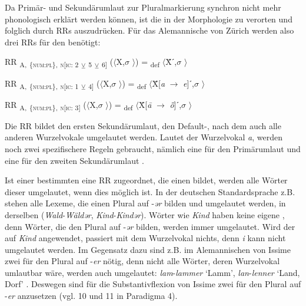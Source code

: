 Da Primär- und Sekundärumlaut zur Pluralmarkierung synchron nicht mehr phonologisch erklärt werden können, ist die  in der Morphologie zu verorten und folglich durch RRs auszudrücken. Für das Alemannische von Zürich werden also drei RRs für den  benötigt:

\ea%
\label{ex:key:49}
 RR \textsubscript{A,} \textsubscript{\{\textsc{num:pl}\},} \textsubscript{\textsc{n[}\textsc{ic:} 2} \textsubscript{\tiny $\veebar$}\textsubscript{ 5} \textsubscript{\tiny $\veebar$}\textsubscript{ 6]} ($\langle$X,$\sigma$ $\rangle$) = \textsubscript{def} $\langle$Ẍˊ,$\sigma$ $\rangle$
\z

\ea%
\label{ex:key:50}
 RR \textsubscript{A,} \textsubscript{\{\textsc{num:pl}\},} \textsubscript{\textsc{n[}\textsc{ic:} 1} \textsubscript{\tiny $\veebar$}\textsubscript{ 4]} ($\langle$X,$\sigma$ $\rangle$) = \textsubscript{def} $\langle$Ẍ[\textit{a} $\rightarrow$ \textit{e}]ˊ,$\sigma$ $\rangle$
\z

\ea%
\label{ex:key:51}
 RR \textsubscript{A,} \textsubscript{\{\textsc{num:pl}\},} \textsubscript{\textsc{n[}\textsc{ic:} 3]} ($\langle$X,$\sigma$ $\rangle$) = \textsubscript{def} $\langle$Ẍ[\textit{\=a} $\rightarrow$ \textit{ȫ}]ˊ,$\sigma$ $\rangle$\\
\z

Die RR  bildet den ersten Sekundärumlaut, den Default-, nach dem auch alle anderen Wurzelvokale umgelautet werden. Lautet der Wurzelvokal \textit{a}, werden noch zwei spezifischere Regeln gebraucht, nämlich eine für den Primärumlaut  und eine für den zweiten Sekundärumlaut .

Ist einer bestimmten  eine RR zugeordnet, die einen  bildet, werden alle Wörter dieser  umgelautet, wenn dies möglich ist. In der deutschen Standardsprache z.B. stehen alle Lexeme, die einen Plural auf -\textit{ər} bilden und umgelautet werden, in derselben  (\textit{Wald}-\textit{Wäldər}, \textit{Kind}-\textit{Kindər}). Wörter wie \textit{Kind} haben keine eigene , denn Wörter, die den Plural auf -\textit{ər} bilden, werden immer umgelautet. Wird der  auf \textit{Kind} angewendet, passiert mit dem Wurzelvokal nichts, denn \textit{i} kann nicht umgelautet werden. Im Gegensatz dazu sind z.B. im Alemannischen von Issime zwei  für den Plural auf -\textit{er} nötig, denn nicht alle Wörter, deren Wurzelvokal umlautbar wäre, werden auch umgelautet: \textit{lam}-\textit{lammer} ‘Lamm’, \textit{lan}-\textit{lenner} ‘Land, Dorf’ \citep[164]{Zürrer1999}. Deswegen sind für die Substantivflexion von Issime zwei  für den Plural auf -\textit{er} anzusetzen (vgl.  10 und 11 in Paradigma 4).  

